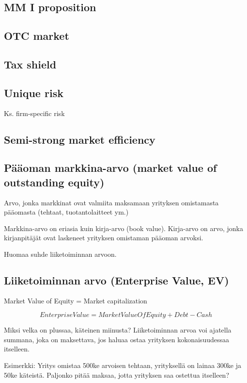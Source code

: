 \documentclass[a4paper]{article}
\begin{document}
\subsection{MM I proposition}

\subsection{OTC market}

\subsection{Tax shield}

\subsection{Unique risk}

Ks. firm-specific risk

\subsection{Semi-strong market efficiency}

\subsection{Pääoman markkina-arvo (market value of outstanding equity)}

Arvo, jonka markkinat ovat valmiita maksamaan yrityksen omistamasta pääomasta (tehtaat, tuotantolaitteet ym.)

Markkina-arvo on eriasia kuin kirja-arvo (book value). Kirja-arvo on arvo, jonka kirjanpitäjät ovat laskeneet yrityksen omistaman pääoman arvoksi.

Huomaa suhde liiketoiminnan arvoon.

\subsection{Liiketoiminnan arvo (Enterprise Value, EV)}

Market Value of Equity = Market capitalization

\[Enterprise Value = Market Value Of Equity + Debt - Cash\]

Miksi velka on plussaa, käteinen miinusta? Liiketoiminnan arvoa voi ajatella summana, joka on maksettava, jos haluaa ostaa yrityksen kokonaisuudessaa itselleen.

Esimerkki: Yritys omistaa 500ke arvoisen tehtaan, yrityksellä on lainaa 300ke ja 50ke käteistä. Paljonko pitää maksaa, jotta yrityksen saa ostettua itselleen?
\end{document}
